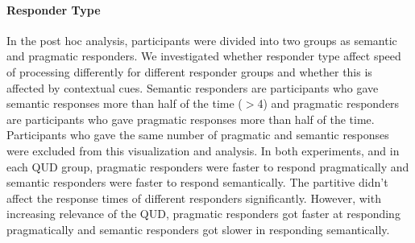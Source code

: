 \documentclass[12pt]{article}
\begin{document}
\paragraph{Responder Type}
In the post hoc analysis, participants were divided into two groups as semantic and pragmatic responders. We investigated whether responder type affect speed of processing differently for different responder groups and whether this is affected by contextual cues. Semantic responders are participants who gave semantic responses more than half of the time ($>$4) and pragmatic responders are participants who gave pragmatic responses more than half of the time. Participants who gave the same number of pragmatic and semantic responses were excluded from this visualization and analysis.
In both experiments, and in each QUD group, pragmatic responders were faster to respond pragmatically and semantic responders were faster to respond semantically. The partitive didn’t affect the response times of different responders significantly. However, with increasing relevance of the QUD, pragmatic responders got faster at responding pragmatically and semantic responders got slower in responding semantically.

\pagebreak
\end{document}
